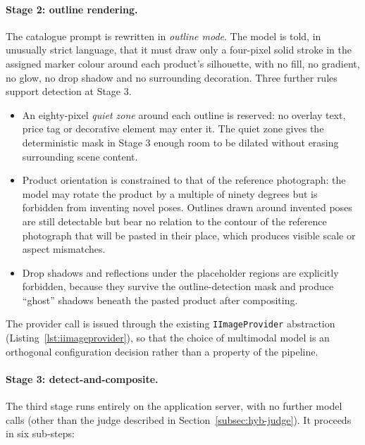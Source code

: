 \paragraph{Stage 2: outline rendering.}
The catalogue prompt is rewritten in \emph{outline mode}. The model is told, in unusually strict language, that it must draw only a four-pixel solid stroke in the assigned marker colour around each product's silhouette, with no fill, no gradient, no glow, no drop shadow and no surrounding decoration. Three further rules support detection at Stage 3.

\begin{itemize}
\item An eighty-pixel \emph{quiet zone} around each outline is reserved: no overlay text, price tag or decorative element may enter it. The quiet zone gives the deterministic mask in Stage 3 enough room to be dilated without erasing surrounding scene content.
\item Product orientation is constrained to that of the reference photograph: the model may rotate the product by a multiple of ninety degrees but is forbidden from inventing novel poses. Outlines drawn around invented poses are still detectable but bear no relation to the contour of the reference photograph that will be pasted in their place, which produces visible scale or aspect mismatches.
\item Drop shadows and reflections under the placeholder regions are explicitly forbidden, because they survive the outline-detection mask and produce ``ghost'' shadows beneath the pasted product after compositing.
\end{itemize}

The provider call is issued through the existing \texttt{IImageProvider} abstraction (Listing~\ref{lst:iimageprovider}), so that the choice of multimodal model is an orthogonal configuration decision rather than a property of the pipeline.

\paragraph{Stage 3: detect-and-composite.}
The third stage runs entirely on the application server, with no further model calls (other than the judge described in Section~\ref{subsec:hyb-judge}). It proceeds in six sub-steps:

